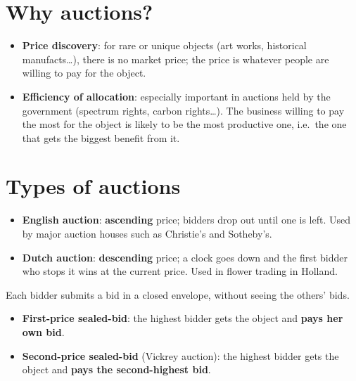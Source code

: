 \documentclass[11pt,a4paper,openany]{book}
\begin{document}
\section{Why auctions?}

\begin{defnbox}[title=Two goals of an auction]
\begin{itemize}
  \item \textbf{Price discovery}: for rare or unique objects (art works, historical
        manufacts\dots), there is no market price; the price is whatever people are willing
        to pay for the object.
  \item \textbf{Efficiency of allocation}: especially important in auctions held by the
        government (spectrum rights, carbon rights\dots). The business willing to pay the
        most for the object is likely to be the most productive one, i.e.\ the one that gets
        the biggest benefit from it.
\end{itemize}
\end{defnbox}


\section{Types of auctions}

\begin{defnbox}[title=Open auctions]
\begin{itemize}
  \item \textbf{English auction}: \textbf{ascending} price; bidders drop out until one is
        left. Used by major auction houses such as Christie's and Sotheby's.
  \item \textbf{Dutch auction}: \textbf{descending} price; a clock goes down and the first
        bidder who stops it wins at the current price. Used in flower trading in Holland.
\end{itemize}
\end{defnbox}

\begin{defnbox}[title=Sealed-bid auctions]
Each bidder submits a bid in a closed envelope, without seeing the others' bids.
\begin{itemize}
  \item \textbf{First-price sealed-bid}: the highest bidder gets the object and \textbf{pays
        her own bid}.
  \item \textbf{Second-price sealed-bid} (Vickrey auction): the highest bidder gets the object
        and \textbf{pays the second-highest bid}.
\end{itemize}
\end{defnbox}
\end{document}
